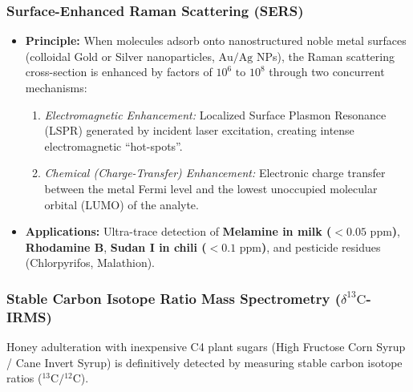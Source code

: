 \documentclass[11pt,a4paper,oneside]{article}
\begin{document}
\subsubsection{Surface-Enhanced Raman Scattering (SERS)}
\begin{itemize}[leftmargin=*]
    \item \textbf{Principle:} When molecules adsorb onto nanostructured noble metal surfaces (colloidal Gold or Silver nanoparticles, $\mathrm{Au/Ag}$ NPs), the Raman scattering cross-section is enhanced by factors of \textbf{$10^6\text{ to }10^8$} through two concurrent mechanisms:
    \begin{enumerate}
        \item \textit{Electromagnetic Enhancement:} Localized Surface Plasmon Resonance (LSPR) generated by incident laser excitation, creating intense electromagnetic ``hot-spots''.
        \item \textit{Chemical (Charge-Transfer) Enhancement:} Electronic charge transfer between the metal Fermi level and the lowest unoccupied molecular orbital (LUMO) of the analyte.
    \end{enumerate}
    \item \textbf{Applications:} Ultra-trace detection of \textbf{Melamine in milk ($<0.05\text{ ppm}$)}, \textbf{Rhodamine B}, \textbf{Sudan I in chili ($<0.1\text{ ppm}$)}, and pesticide residues (Chlorpyrifos, Malathion).
\end{itemize}

\subsubsection{\texorpdfstring{Stable Carbon Isotope Ratio Mass Spectrometry ($\delta^{13}\mathrm{C}$-IRMS)}{Stable Carbon Isotope Ratio Mass Spectrometry (delta-13C-IRMS)}}
Honey adulteration with inexpensive C4 plant sugars (High Fructose Corn Syrup / Cane Invert Syrup) is definitively detected by measuring stable carbon isotope ratios (${}^{13}\mathrm{C}/{}^{12}\mathrm{C}$).
\end{document}
